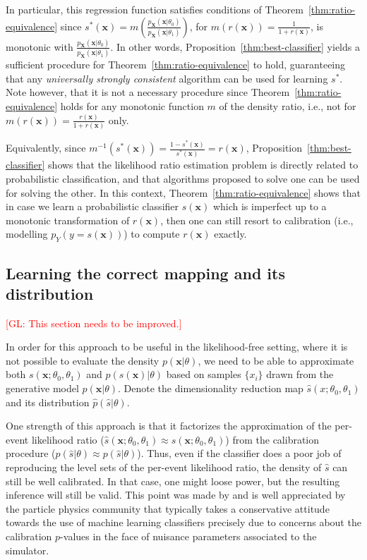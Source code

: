 \documentclass[12pt]{article}
\numberwithin{equation}{section}
\theoremstyle{plain}
\newcommand{\glnote}[1]{\textcolor{red}{[GL: #1]}}
\begin{document}
In particular, this regression function satisfies conditions of
Theorem~\ref{thm:ratio-equivalence} since $s^*(\mathbf{x}) =
m(\frac{p_\mathbf{X}(\mathbf{x}|\theta_0)}{p_\mathbf{X}(\mathbf{x}|\theta_1)})$,
for $m(r(\mathbf{x})) = \frac{1}{1 + r(\mathbf{x})}$, is monotonic with
$\frac{p_\mathbf{X}(\mathbf{x}|\theta_0)}{p_\mathbf{X}(\mathbf{x}|\theta_1)}$.
In other words, Proposition~\ref{thm:best-classifier} yields a sufficient
procedure for Theorem~\ref{thm:ratio-equivalence} to hold, guaranteeing that any
{\it universally strongly consistent} algorithm can be used for learning $s^*$.
Note however, that it is not a necessary procedure since
Theorem~\ref{thm:ratio-equivalence} holds for any monotonic function $m$ of the
density ratio, i.e., not for $m(r(\mathbf{x})) = \frac{r(\mathbf{x})}{1 +
r(\mathbf{x})}$ only.

Equivalently, since $m^{-1}(s^*(\mathbf{x})) = \frac{1 -
s^*(\mathbf{x})}{s^*(\mathbf{x})} = r(\mathbf{x})$,
Proposition~\ref{thm:best-classifier} shows that the likelihood ratio estimation
problem is directly related to probabilistic classification, and that algorithms
proposed to solve one can be used for solving the other. In this context,
Theorem~\ref{thm:ratio-equivalence} shows that in case we learn a probabilistic
classifier $s(\mathbf{x})$ which is imperfect up to a monotonic transformation
of $r(\mathbf{x})$, then one can still resort to calibration (i.e., modelling
$p_Y(y=s(\mathbf{x}))$) to compute $r(\mathbf{x})$ exactly.

\subsection{Learning the correct mapping and its distribution}

\glnote{This section needs to be improved.}

In order for this approach to be useful in the likelihood-free setting, where it
is not possible to evaluate the density $p(\mathbf{x}|\theta)$, we need to be
able to approximate both $s(\mathbf{x};\theta_0, \theta_1)$ and
$p(s(\mathbf{x})|\theta)$ based on samples $\{x_i\}$ drawn from the generative
model $p(\mathbf{x}|\theta)$.  Denote the dimensionality reduction map
$\hat{s}(x; \theta_0, \theta_1)$ and its distribution $\hat{p}(\hat{s}|\theta)$.

One strength of this approach is that it factorizes the approximation of the
per-event likelihood ratio ($\hat{s}(\mathbf{x}; \theta_0, \theta_1) \approx
s(\mathbf{x}; \theta_0, \theta_1)$) from the calibration procedure ($\hat p(\hat
s| \theta) \approx p(\hat{s}|\theta)$). Thus, even if the classifier does a poor
job of reproducing the level sets of the per-event likelihood ratio, the density
of $\hat{s}$ can still be well calibrated. In that case, one might loose power,
but the resulting inference will still be valid. This point was made by
\cite{Neal:2007zz} and is well appreciated by the particle physics community
that typically takes a conservative attitude towards the use of machine learning
classifiers precisely due to concerns about the calibration $p$-values in the
face of nuisance parameters associated to the simulator.
\end{document}
